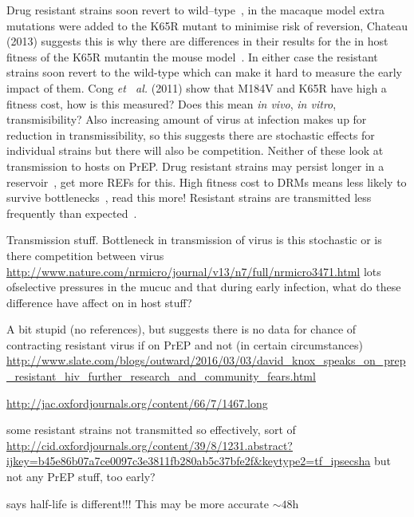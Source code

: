 \documentclass[DIV=15]{scrartcl}
\begin{document}
Drug resistant strains soon revert to wild--type~\cite{cong2011},  in the macaque model extra mutations were added to the K65R mutant  to minimise risk  of reversion, Chateau (2013) suggests this is why there  are differences in their results for the in host fitness of the K65R mutantin the mouse model~\cite{chateau2013}. In either case the resistant strains soon revert to the wild-type which can make it hard to measure the early  impact of them. Cong \textit{et \ al.} (2011) show that  M184V and K65R have high a fitness cost, how is this measured? Does this mean \textit{in vivo}, \textit{in vitro}, transmisibility? Also increasing amount of virus at infection makes up for reduction in transmissibility, so this suggests there are stochastic effects for individual strains but there will also be competition. Neither of these look at transmission to hosts on PrEP. Drug resistant strains may persist longer in a reservoir~\cite{chateau2013}, get more REFs for this.
High fitness cost to DRMs means less likely to survive bottlenecks~\cite{wagner2012}, read this more! Resistant strains are transmitted  less frequently than expected~\cite{leighbrown2003}.





Transmission stuff. Bottleneck in transmission of virus is this stochastic or is there competition between virus
\url{http://www.nature.com/nrmicro/journal/v13/n7/full/nrmicro3471.html}
lots ofselective pressures in the mucuc and that during early infection, what do these difference have affect on in host stuff?

A bit stupid (no references), but suggests there is no data  for chance of contracting resistant virus if on PrEP and not (in certain circumstances) 
\url{http://www.slate.com/blogs/outward/2016/03/03/david_knox_speaks_on_prep_resistant_hiv_further_research_and_community_fears.html}





\url{http://jac.oxfordjournals.org/content/66/7/1467.long}



some resistant strains not transmitted so effectively, sort of
\url{http://cid.oxfordjournals.org/content/39/8/1231.abstract?ijkey=b45e86b07a7ce0097c3e3811fb280ab5c37bfe2f&keytype2=tf_ipsecsha}
but not any PrEP stuff, too early?





says half-life is different!!! This may be more accurate $\sim 48$h~\cite{patterson2011}
\end{document}
